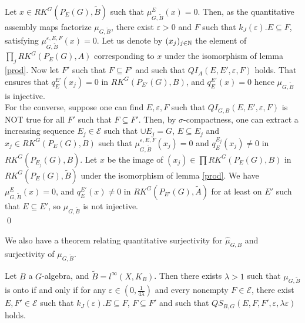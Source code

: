 \begin{dem}
Let $x\in RK^G(P_E(G),\tilde B)$ such that $\mu_{G,\tilde B}^E(x)=0$. Then, as the quantitative assembly maps factorize $\mu_{G,\tilde B}$, there exist $\varepsilon>0$ and $F$ such that $k_J(\varepsilon). E \subseteq F$, satisfying $\mu_{G,\tilde B}^{\varepsilon,E,F}(x)=0$. Let us denote by $(x_j)_{j\in \mathbb N}$ the element of $\prod_j RK^G(P_E(G),A)$ corresponding to $x$ under the isomorphism of lemma \ref{prod}. Now let $F'$ such that $F\subseteq F'$ and such that $QI_{A}(E,E',\varepsilon,F)$ holds. That ensures that $q_E^{E'}(x_j)=0$ in $RK^G(P_{E'}(G),B)$, and $q_E^{E'}(x)=0$ hence $\mu_{G,\tilde B}$ is injective.\\


For the converse, suppose one can find $E,\varepsilon,F$ such that $QI_{G,B}(E,E',\varepsilon,F)$ is NOT true for all $F'$ such that $F\subseteq F'$. Then, by $\sigma$-compactness, one can extract a increasing sequence $E_j\in \mathcal E$ such that $\cup E_j =G$, $E\subseteq E_j$ and $x_j\in RK^G(P_E(G),B)$ such that $\mu_{G,\tilde B}^{\varepsilon,E,F}(x_j)=0$ and $q_E^{E_j}(x_j)\neq 0$ in $RK^G(P_{E_j}(G),B)$. Let $x$ be the image of $(x_j)\in \prod RK^G(P_E(G),B)$ in $RK^G(P_E(G),\tilde B)$ under the isomorphism of lemma \ref{prod}. We have $\mu_{G,\tilde B}^E(x)=0$, and $q_E^{E'}(x)\neq 0$ in $RK^G(P_{E'}(G),\tilde A)$ for at least on $E'$ such that $E\subseteq E'$, so $\mu_{G,\tilde B}$ is not injective. \\
\qed   
\end{dem}

We also have a theorem relating quantitative surjectivity for $\hat\mu_{G,B}$ and surjectivity of $\mu_{G,\tilde B}$.

\begin{thm}\label{Quant2}
Let $B$ a $G$-algebra, and $\tilde B = l^\infty(X,K_B)$. Then there exists $\lambda>1$ such that $\mu_{G,\tilde B}$ is onto if and only if for any $\varepsilon\in ( 0 ,\frac{1}{4\lambda})$ and every nonempty $F\in\mathcal E$, there exist $E,F'\in\mathcal E$ such that  $k_J(\varepsilon) .E \subseteq F$, $F\subseteq F'$ and such that $QS_{B,G}(E,F,F',\varepsilon,\lambda\varepsilon)$ holds.
\end{thm}

